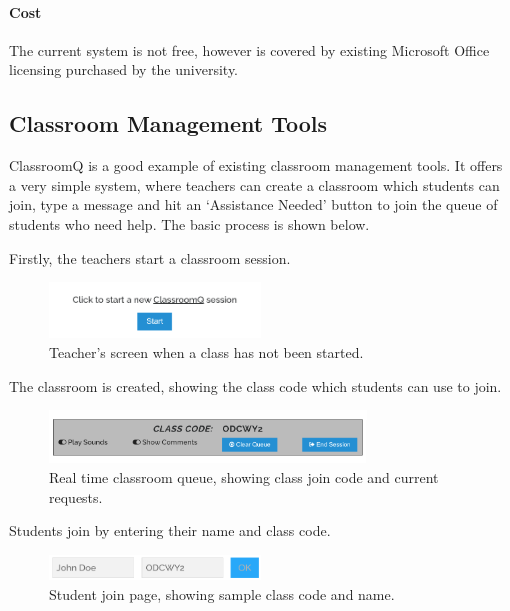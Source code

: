\documentclass[a4paper,11pt]{article}
\begin{document}
\paragraph{Cost}  
The current system is not free, however is covered by existing Microsoft Office licensing purchased by the university.  


\newpage
\subsection{Classroom Management Tools}

ClassroomQ is a good example of existing classroom management tools. It offers a very simple system, where teachers can create a classroom which students can join, type a message and hit an `Assistance Needed' button to join the queue of students who need help. The basic process is shown below.

Firstly, the teachers start a classroom session.

\FloatBarrier
\begin{figure}[H]
  \centering
  \includegraphics[width=0.5\textwidth]{cq1.png}
  \caption{Teacher's screen when a class has not been started.}
\end{figure}

The classroom is created, showing the class code which students can use to join.

\FloatBarrier
\begin{figure}[H]
  \centering
  \includegraphics[width=0.75\textwidth]{cq2.png}
  \caption{Real time classroom queue, showing class join code and current requests.}
\end{figure}

Students join by entering their name and class code.

\FloatBarrier
\begin{figure}[H]
  \centering
  \includegraphics[width=0.5\textwidth]{cq3.png}
  \caption{Student join page, showing sample class code and name.}
\end{figure}
\end{document}
